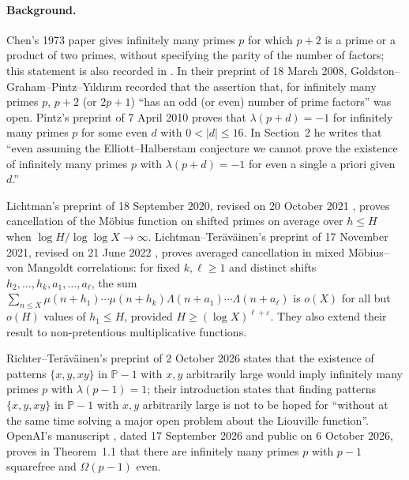 \documentclass[11pt]{article}
\theoremstyle{definition}
\theoremstyle{definition}
\begin{document}
\paragraph{Background.}
Chen's 1973 paper \cite{Chen1973} gives infinitely many primes $p$ for
which $p+2$ is a prime or a product of two primes, without specifying
the parity of the number of factors; this statement is also recorded in
\cite[Section~1]{Pintz2010}.
In their preprint of 18 March 2008, Goldston--Graham--Pintz--Y\i ld\i r\i m
\cite[Section~1]{GGPY2008} recorded that the assertion that, for infinitely
many primes $p$, $p+2$ (or $2p+1$) ``has an odd (or even) number of prime
factors'' was open.
Pintz's preprint of 7 April 2010 \cite[Theorem~1]{Pintz2010} proves that
$\lambda(p+d)=-1$ for infinitely many primes $p$ for some even $d$ with
$0<|d|\le16$. In Section~2 he writes that ``even assuming the
Elliott--Halberstam conjecture we cannot prove the existence of infinitely
many primes $p$ with $\lambda(p+d)=-1$ for even a single a priori
given~$d$.''

Lichtman's preprint of 18 September 2020, revised on 20 October 2021
\cite{Lichtman2020}, proves cancellation of the M\"obius function on
shifted primes on average over $h\le H$ when
$\log H/\log\log X\to\infty$.
Lichtman--Ter\"av\"ainen's preprint of 17 November 2021, revised on
21 June 2022 \cite{LT2021}, proves averaged cancellation in mixed
M\"obius--von Mangoldt correlations: for fixed $k,\ell\ge1$ and distinct
shifts $h_2,\ldots,h_k,a_1,\ldots,a_\ell$, the sum
$\sum_{n\le X}\mu(n+h_1)\cdots\mu(n+h_k)
\Lambda(n+a_1)\cdots\Lambda(n+a_\ell)$ is $o(X)$ for all but $o(H)$
values of $h_1\le H$, provided $H\ge(\log X)^{\ell+\varepsilon}$.
They also extend their result to non-pretentious multiplicative functions.

Richter--Ter\"av\"ainen's preprint of 2 October 2026
\cite[Proposition~1.2]{RT2026} states that the existence of patterns
$\{x,y,xy\}$ in $\mathbb P-1$ with $x,y$ arbitrarily large would imply
infinitely many primes $p$ with $\lambda(p-1)=1$; their introduction
states that finding patterns $\{x,y,xy\}$ in $\mathbb P-1$ with $x,y$ arbitrarily
large is not to be hoped for ``without at the same time solving a major open
problem about the Liouville function''.
OpenAI's manuscript \cite{OpenAIE}, dated 17 September 2026 and public
on 6 October 2026, proves in Theorem~1.1 that there are infinitely many
primes $p$ with $p-1$ squarefree and $\Omega(p-1)$ even.
\end{document}
